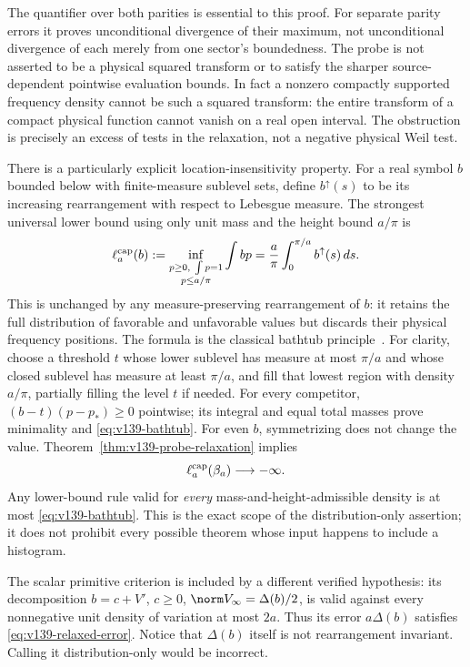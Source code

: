 The quantifier over both parities is essential to this proof.
For separate parity errors it proves unconditional divergence of
their maximum, not unconditional divergence of each merely from
one sector's boundedness. The probe is not asserted to be a physical
squared transform or to satisfy the sharper source-dependent
pointwise evaluation bounds. In fact a nonzero compactly supported
frequency density cannot be such a squared transform: the entire
transform of a compact physical function cannot vanish on a real
open interval. The obstruction is precisely an excess of tests
in the relaxation, not a negative physical Weil test.

There is a particularly explicit location-insensitivity property.
For a real symbol $b$ bounded below with finite-measure sublevel sets,
define $b^\uparrow(s)$ to be its increasing rearrangement with respect
to Lebesgue measure. The strongest universal lower bound using only
unit mass and the height bound $a/\pi$ is
\begin{equation}\label{eq:v139-bathtub}
 \ell_a^{\rm cap}(b):=
 \inf_{\substack{p\ge0,\ \int p=1\\p\le a/\pi}}
        \int bp
 =\frac a\pi\int_0^{\pi/a} b^\uparrow(s)\,ds.
\end{equation}
This is unchanged by any measure-preserving rearrangement of $b$:
it retains the full distribution of favorable and unfavorable values
but discards their physical frequency positions. The formula is the
classical bathtub principle~\cite[Section 1.14]{LiebLoss2001}.
For clarity, choose a threshold $t$ whose lower sublevel has measure
at most $\pi/a$ and whose closed sublevel has measure at least
$\pi/a$, and fill that lowest region with density $a/\pi$, partially
filling the level $t$ if needed. For every competitor,
$(b-t)(p-p_*)\ge0$ pointwise; its integral and equal total masses
prove minimality and \eqref{eq:v139-bathtub}.
For even $b$, symmetrizing does not change the value.
Theorem~\ref{thm:v139-probe-relaxation} implies
\begin{equation}\label{eq:v139-cap-divergence}
 \ell_a^{\rm cap}(\beta_a)\longrightarrow-\infty.
\end{equation}
Any lower-bound rule valid for \emph{every} mass-and-height-admissible
density is at most \eqref{eq:v139-bathtub}. This is the exact scope of
the distribution-only assertion; it does not prohibit every possible
theorem whose input happens to include a histogram.

The scalar primitive criterion is included by a different verified
hypothesis: its decomposition $b=c+V'$, $c\ge0$,
$\norm V_\infty=\Delta(b)/2$, is valid against every nonnegative
unit density of variation at most $2a$. Thus its error $a\Delta(b)$
satisfies \eqref{eq:v139-relaxed-error}. Notice that $\Delta(b)$
itself is not rearrangement invariant. Calling it distribution-only
would be incorrect.

